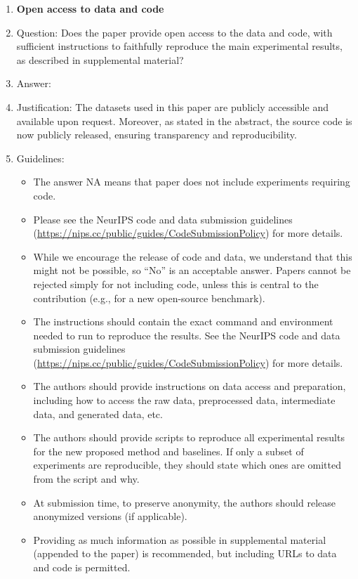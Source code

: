 \documentclass{article}
\begin{document}
\begin{enumerate}
\item {\bf Open access to data and code}
    \item[] Question: Does the paper provide open access to the data and code, with sufficient instructions to faithfully reproduce the main experimental results, as described in supplemental material?
    \item[] Answer: \answerYes{} %
    \item[] Justification: The datasets used in this paper are publicly accessible and available upon request. Moreover, as stated in the abstract, the source code is now publicly released, ensuring transparency and reproducibility.
    \item[] Guidelines:
    \begin{itemize}
        \item The answer NA means that paper does not include experiments requiring code.
        \item Please see the NeurIPS code and data submission guidelines (\url{https://nips.cc/public/guides/CodeSubmissionPolicy}) for more details.
        \item While we encourage the release of code and data, we understand that this might not be possible, so “No” is an acceptable answer. Papers cannot be rejected simply for not including code, unless this is central to the contribution (e.g., for a new open-source benchmark).
        \item The instructions should contain the exact command and environment needed to run to reproduce the results. See the NeurIPS code and data submission guidelines (\url{https://nips.cc/public/guides/CodeSubmissionPolicy}) for more details.
        \item The authors should provide instructions on data access and preparation, including how to access the raw data, preprocessed data, intermediate data, and generated data, etc.
        \item The authors should provide scripts to reproduce all experimental results for the new proposed method and baselines. If only a subset of experiments are reproducible, they should state which ones are omitted from the script and why.
        \item At submission time, to preserve anonymity, the authors should release anonymized versions (if applicable).
        \item Providing as much information as possible in supplemental material (appended to the paper) is recommended, but including URLs to data and code is permitted.
    \end{itemize}



\end{enumerate}
\end{document}
